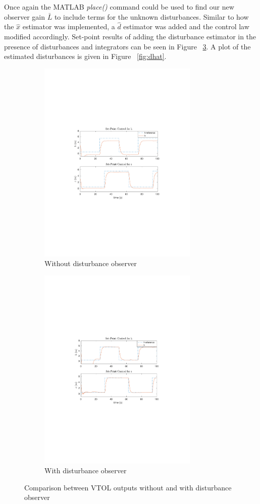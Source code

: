 \documentclass[dvips,12pt]{article}
\begin{document}
Once again the MATLAB \textit{place()} command could be used to find our new observer gain $\bar{L}$ to include terms for the unknown disturbances. Similar to how the $\hat{x}$ estimator was implemented, a $\hat{d}$ estimator was added and the control law modified accordingly. Set-point results of adding the disturbance estimator in the presence of disturbances and integrators can be seen in Figure ~\ref{fig:nodistobsvsdistobs}.  A plot of the estimated disturbances is given in Figure ~\ref{fig:dhat}.

\begin{figure}[h]
\centering
\begin{subfigure}{.5\textwidth}
  \centering
  \includegraphics[trim = {4cm 8.5cm 4cm 8.5cm},clip,width=3in]{observer_w_dist_and_int.pdf}
  \caption{Without disturbance observer}
  \label{fig:sub3}
\end{subfigure}%
\begin{subfigure}{.5\textwidth}
  \centering
  \includegraphics[trim = {4cm 8.5cm 4cm 8.5cm},clip,width=3in]{dist_observer_w_dist_and_int.pdf}
  \caption{With disturbance observer}
  \label{fig:sub4}
\end{subfigure}
\caption{Comparison between VTOL outputs without and with disturbance observer}
\label{fig:nodistobsvsdistobs}
\end{figure}
\end{document}
